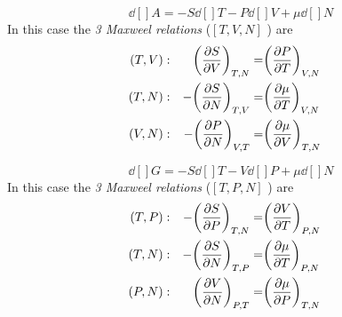 \documentclass[../main/main.tex]{subfiles}
\begin{document}
\begin{example}[Helmholz \( A=A(T,V,N) \)]
\begin{equation}
  \dd[]{A} = - S \dd[]{T} - P \dd[]{V} + \mu \dd[]{N}
\end{equation}
In this case the \emph{3 Maxweel relations} (\( [T,V,N] \) ) are
\begin{subequations}
\begin{align}
  (T,V) &:& \qty(\pdv{S}{V} )_{T,N} =&  \qty(\pdv{P}{T} )_{V,N} & \\
  (T,N) &:& -\qty(\pdv{S}{N} )_{T,V} =& \qty(\pdv{\mu }{T} )_{V,N} &\\
  (V,N) &:& -\qty(\pdv{P}{N} )_{V,T} =& \qty(\pdv{\mu }{V} )_{T,N} &
 \end{align}
\label{}
\end{subequations}
\end{example}
\begin{example}[Gibbs \( G=G(T,P,N) \) ]
  \begin{equation}
    \dd[]{G} = - S \dd[]{T} - V \dd[]{P} + \mu \dd[]{N}
  \end{equation}
  In this case the \emph{3 Maxweel relations} (\( [T,P,N] \) ) are
  \begin{subequations}
  \begin{align}
    (T,P) &:& -\qty(\pdv{S}{P} )_{T,N} =&  \qty(\pdv{V}{T} )_{P,N} & \\
    (T,N) &:& -\qty(\pdv{S}{N} )_{T,P} =& \qty(\pdv{\mu }{T} )_{P,N} &\\
    (P,N) &:& \qty(\pdv{V}{N} )_{P,T} =& \qty(\pdv{\mu }{P} )_{T,N} &
   \end{align}
  \label{}
  \end{subequations}
\end{example}
\end{document}
